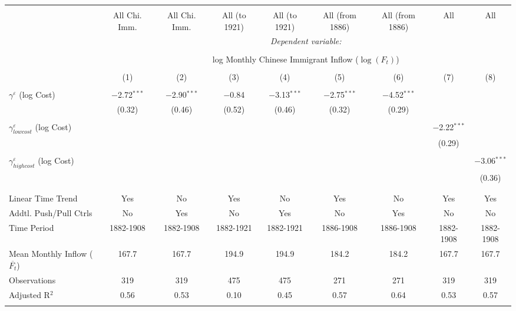 
\begin{tabular}{@{\extracolsep{5pt}}lcccccccc} 
\\[-1.8ex]\hline 
\hline \\[-1.8ex] 
 & All Chi. Imm. & All Chi. Imm. & All (to 1921) & All (to 1921) & All (from 1886) & All (from 1886) & All & All \\ 
 & \multicolumn{8}{c}{\textit{Dependent variable:}} \\ 
\cline{2-9} 
\\[-1.8ex] & \multicolumn{8}{c}{log Monthly Chinese Immigrant Inflow ($\log(F_{t})$)} \\ 
\\[-1.8ex] & (1) & (2) & (3) & (4) & (5) & (6) & (7) & (8)\\ 
\hline \\[-1.8ex] 
 $\gamma^{\varepsilon}$ (log Cost) & $-$2.72$^{***}$ & $-$2.90$^{***}$ & $-$0.84 & $-$3.13$^{***}$ & $-$2.75$^{***}$ & $-$4.52$^{***}$ &  &  \\ 
  & (0.32) & (0.46) & (0.52) & (0.46) & (0.32) & (0.29) &  &  \\ 
  & & & & & & & & \\ 
 $\gamma^{\varepsilon}_{lowcost}$ (log Cost) &  &  &  &  &  &  & $-$2.22$^{***}$ &  \\ 
  &  &  &  &  &  &  & (0.29) &  \\ 
  & & & & & & & & \\ 
 $\gamma^{\varepsilon}_{highcost}$ (log Cost) &  &  &  &  &  &  &  & $-$3.06$^{***}$ \\ 
  &  &  &  &  &  &  &  & (0.36) \\ 
  & & & & & & & & \\ 
\hline \\[-1.8ex] 
Linear Time Trend & Yes & No & Yes & No & Yes & No & Yes & Yes \\ 
Addtl. Push/Pull Ctrls & No & Yes & No & Yes & No & Yes & No & No \\ 
Time Period & 1882-1908 & 1882-1908 & 1882-1921 & 1882-1921 & 1886-1908 & 1886-1908 & 1882-1908 & 1882-1908 \\ 
Mean Monthly Inflow ($\overline{F_t}$) & 167.7 & 167.7 & 194.9 & 194.9 & 184.2 & 184.2 & 167.7 & 167.7 \\ 
Observations & 319 & 319 & 475 & 475 & 271 & 271 & 319 & 319 \\ 
Adjusted R$^{2}$ & 0.56 & 0.53 & 0.10 & 0.45 & 0.57 & 0.64 & 0.53 & 0.57 \\ 
\hline 
\hline \\[-1.8ex] 
\end{tabular} 
